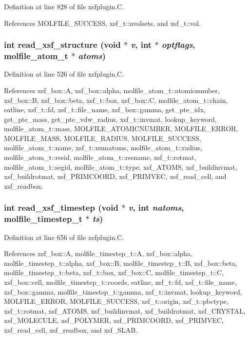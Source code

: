 Definition at line 828 of file xsfplugin.C.

References MOLFILE\_\-SUCCESS, xsf\_\-t::nvolsets, and xsf\_\-t::vol.
\subsubsection{\setlength{\rightskip}{0pt plus 5cm}int read\_\-xsf\_\-structure (void $\ast$ {\em v}, int $\ast$ {\em optflags}, {\bf molfile\_\-atom\_\-t} $\ast$ {\em atoms})\hspace{0.3cm}{\tt  [static]}}\label{xsfplugin_8C_a40}




Definition at line 526 of file xsfplugin.C.

References xsf\_\-box::A, xsf\_\-box::alpha, molfile\_\-atom\_\-t::atomicnumber, xsf\_\-box::B, xsf\_\-box::beta, xsf\_\-t::box, xsf\_\-box::C, molfile\_\-atom\_\-t::chain, eatline, xsf\_\-t::fd, xsf\_\-t::file\_\-name, xsf\_\-box::gamma, get\_\-pte\_\-idx, get\_\-pte\_\-mass, get\_\-pte\_\-vdw\_\-radius, xsf\_\-t::invmat, lookup\_\-keyword, molfile\_\-atom\_\-t::mass, MOLFILE\_\-ATOMICNUMBER, MOLFILE\_\-ERROR, MOLFILE\_\-MASS, MOLFILE\_\-RADIUS, MOLFILE\_\-SUCCESS, molfile\_\-atom\_\-t::name, xsf\_\-t::numatoms, molfile\_\-atom\_\-t::radius, molfile\_\-atom\_\-t::resid, molfile\_\-atom\_\-t::resname, xsf\_\-t::rotmat, molfile\_\-atom\_\-t::segid, molfile\_\-atom\_\-t::type, xsf\_\-ATOMS, xsf\_\-buildinvmat, xsf\_\-buildrotmat, xsf\_\-PRIMCOORD, xsf\_\-PRIMVEC, xsf\_\-read\_\-cell, and xsf\_\-readbox.
\subsubsection{\setlength{\rightskip}{0pt plus 5cm}int read\_\-xsf\_\-timestep (void $\ast$ {\em v}, int {\em natoms}, {\bf molfile\_\-timestep\_\-t} $\ast$ {\em ts})\hspace{0.3cm}{\tt  [static]}}\label{xsfplugin_8C_a41}




Definition at line 656 of file xsfplugin.C.

References xsf\_\-box::A, molfile\_\-timestep\_\-t::A, xsf\_\-box::alpha, molfile\_\-timestep\_\-t::alpha, xsf\_\-box::B, molfile\_\-timestep\_\-t::B, xsf\_\-box::beta, molfile\_\-timestep\_\-t::beta, xsf\_\-t::box, xsf\_\-box::C, molfile\_\-timestep\_\-t::C, xsf\_\-box::cell, molfile\_\-timestep\_\-t::coords, eatline, xsf\_\-t::fd, xsf\_\-t::file\_\-name, xsf\_\-box::gamma, molfile\_\-timestep\_\-t::gamma, xsf\_\-t::invmat, lookup\_\-keyword, MOLFILE\_\-ERROR, MOLFILE\_\-SUCCESS, xsf\_\-t::origin, xsf\_\-t::pbctype, xsf\_\-t::rotmat, xsf\_\-ATOMS, xsf\_\-buildinvmat, xsf\_\-buildrotmat, xsf\_\-CRYSTAL, xsf\_\-MOLECULE, xsf\_\-POLYMER, xsf\_\-PRIMCOORD, xsf\_\-PRIMVEC, xsf\_\-read\_\-cell, xsf\_\-readbox, and xsf\_\-SLAB.
